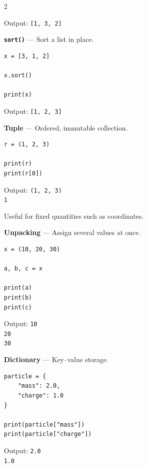 \documentclass[10pt,a4paper]{article}
\begin{document}
\begin{multicols}{2}
\begin{card}
Output:
\texttt{[1, 3, 2]}
\end{card}

\begin{card}
\textbf{\texttt{sort()}} --- Sort a list in place.

\begin{lstlisting}[style=pythonstyle]
x = [3, 1, 2]

x.sort()

print(x)
\end{lstlisting}

Output:
\texttt{[1, 2, 3]}
\end{card}

\begin{card}
\textbf{Tuple} --- Ordered, immutable collection.

\begin{lstlisting}[style=pythonstyle]
r = (1, 2, 3)

print(r)
print(r[0])
\end{lstlisting}

Output:
\texttt{(1, 2, 3)}\\
\texttt{1}

Useful for fixed quantities such as coordinates.
\end{card}

\begin{card}
\textbf{Unpacking} --- Assign several values at once.

\begin{lstlisting}[style=pythonstyle]
x = (10, 20, 30)

a, b, c = x

print(a)
print(b)
print(c)
\end{lstlisting}

Output:
\texttt{10}\\
\texttt{20}\\
\texttt{30}
\end{card}

\begin{card}
\textbf{Dictionary} --- Key--value storage.

\begin{lstlisting}[style=pythonstyle]
particle = {
    "mass": 2.0,
    "charge": 1.0
}

print(particle["mass"])
print(particle["charge"])
\end{lstlisting}

Output:
\texttt{2.0}\\
\texttt{1.0}
\end{card}


\end{multicols}
\end{document}
